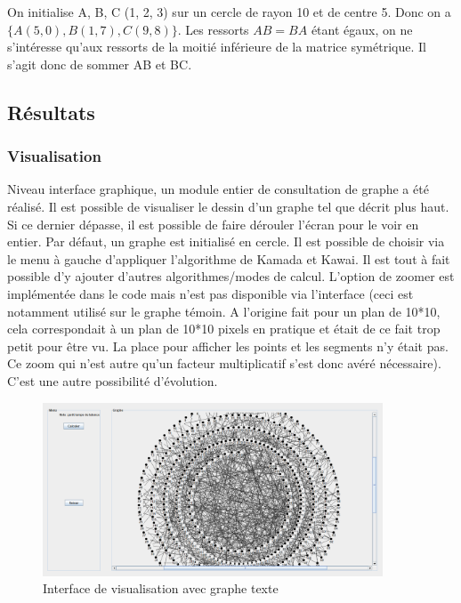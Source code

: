 \documentclass[a4paper,12pt]{article}
\begin{document}
On initialise A, B, C (1, 2, 3) sur un cercle de rayon 10 et de centre 5. Donc on a $\{A(5, 0), B(1, 7), C(9, 8)\}$. Les ressorts $AB = BA$ étant égaux, on ne s'intéresse qu'aux ressorts de la moitié inférieure de la matrice symétrique. Il s'agit donc de sommer AB et BC. 

\subsection{Résultats}

\subsubsection{Visualisation}

Niveau interface graphique, un module entier de consultation de graphe a été réalisé. Il est possible de visualiser le dessin d’un graphe tel que décrit plus haut. Si ce dernier dépasse, il est possible de faire dérouler l’écran pour le voir en entier. Par défaut, un graphe est initialisé en cercle. Il est possible de choisir via le menu à gauche d’appliquer l’algorithme de Kamada et Kawai. Il est tout à fait possible d’y ajouter d’autres algorithmes/modes de calcul. L’option de zoomer est implémentée dans le code mais n’est pas disponible via l’interface (ceci est notamment utilisé sur le graphe témoin. A l’origine fait pour un plan de 10*10, cela correspondait à un plan de 10*10 pixels en pratique et était de ce fait trop petit pour être vu. La place pour afficher les points et les segments n’y était pas. Ce zoom qui n’est autre qu’un facteur multiplicatif s’est donc avéré nécessaire). C’est une autre possibilité d’évolution.

\begin {figure}[H]
    \centering
    \includegraphics[width=0.9\textwidth]{interface.png}
    \caption{Interface de visualisation avec graphe texte}
\end {figure}
\end{document}
